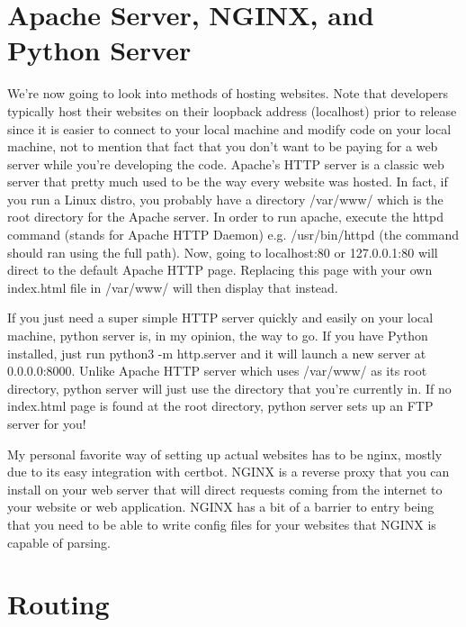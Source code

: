 \documentclass{article}
\begin{document}
\section{Apache Server, NGINX, and Python Server}

We're now going to look into methods of hosting websites. Note that developers typically host their websites on
their loopback address (localhost) prior to release since it is easier to connect to your local machine and
modify code on your local machine, not to mention that fact that you don't want to be paying for a web server
while you're developing the code. Apache's HTTP server is a classic web server that pretty much used to be the
way every website was hosted. In fact, if you run a Linux distro, you probably have a directory /var/www/ which
is the root directory for the Apache server. In order to run apache, execute the httpd command (stands for
Apache HTTP Daemon) e.g. /usr/bin/httpd (the command should ran using the full path). Now, going to
localhost:80 or 127.0.0.1:80 will direct to the default Apache HTTP page. Replacing this page with your own
index.html file in /var/www/ will then display that instead.

If you just need a super simple HTTP server quickly and easily on your local machine, python server is, in my
opinion, the way to go. If you have Python installed, just run python3 -m http.server and it will launch a new
server at 0.0.0.0:8000. Unlike Apache HTTP server which uses /var/www/ as its root directory, python server will
just use the directory that you're currently in. If no index.html page is found at the root directory, python
server sets up an FTP server for you!

My personal favorite way of setting up actual websites has to be nginx, mostly due to its easy integration with
certbot. NGINX is a reverse proxy that you can install on your web server that will direct requests coming
from the internet to your website or web application. NGINX has a bit of a barrier to entry being that you need
to be able to write config files for your websites that NGINX is capable of parsing.

\section{Routing}
\end{document}
